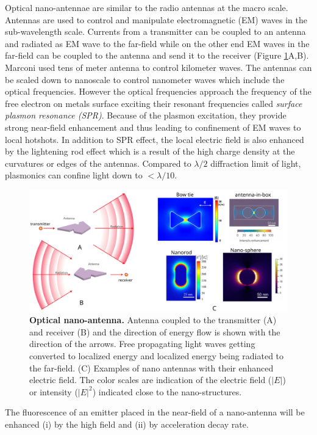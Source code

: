 Optical nano-antennae are similar to the radio antennas at the macro scale.
Antennas are used to control and manipulate electromagnetic (EM) waves in the sub-wavelength scale.
Currents from a transmitter can be coupled to an antenna and radiated as EM wave to the far-field while on the other end EM waves in the far-field can be coupled to the antenna and send it to the receiver (Figure \ref{fig:nano_antenna}A,B).
Marconi used tens of meter antenna to control kilometer waves. 
The antennas can be scaled down to nanoscale to control nanometer waves which include the optical frequencies.
However the optical frequencies approach the frequency of the free electron on metals surface exciting their resonant frequencies called \textit{surface plasmon resonance (SPR)}.
Because of the plasmon excitation, they provide strong near-field enhancement and thus leading to confinement of EM waves to local hotshots.\cite{bath8624,schuller2010plasmonics,ozbay2006plasmonics,maier2005plasmonics,hess2012active}
In addition to SPR effect, the local electric field is also enhanced by the lightening rod effect which is a result of the high charge density at the curvatures or edges of the antennas.
Compared to $\lambda/2$ diffraction limit of light, plasmonics can confine light down to ${<}\lambda/10$.
\begin{figure}
	\centering
	\includegraphics[width=\textwidth]{nano_antenna}
	\caption{\textbf{Optical nano-antenna.} Antenna coupled to the transmitter (A) and receiver (B) and the direction of energy flow is shown with the direction of the arrows.
	Free propagating light waves getting converted to localized energy and localized energy being radiated to the far-field.
	(C) Examples of nano antennas with their enhanced electric field.
	The color scales are indication of the electric field ($|E|$) or intensity ($|E|^2$) indicated close to the nano-structures.}
	\label{fig:nano_antenna}
\end{figure}
The fluorescence of an emitter placed in the near-field of a nano-antenna will be enhanced (i) by the high field and (ii) by acceleration decay rate.
